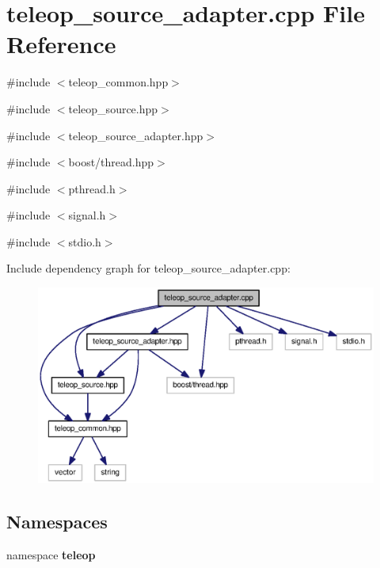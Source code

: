 \section{teleop\_\-source\_\-adapter.cpp File Reference}
\label{teleop__source__adapter_8cpp}
{\ttfamily \#include $<$teleop\_\-common.hpp$>$}\par
{\ttfamily \#include $<$teleop\_\-source.hpp$>$}\par
{\ttfamily \#include $<$teleop\_\-source\_\-adapter.hpp$>$}\par
{\ttfamily \#include $<$boost/thread.hpp$>$}\par
{\ttfamily \#include $<$pthread.h$>$}\par
{\ttfamily \#include $<$signal.h$>$}\par
{\ttfamily \#include $<$stdio.h$>$}\par
Include dependency graph for teleop\_\-source\_\-adapter.cpp:
\nopagebreak
\begin{figure}[H]
\begin{center}
\leavevmode
\includegraphics[width=400pt]{teleop__source__adapter_8cpp__incl}
\end{center}
\end{figure}
\subsection*{Namespaces}
\begin{DoxyCompactItemize}
\item 
namespace {\bf teleop}
\end{DoxyCompactItemize}
